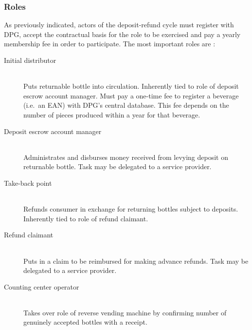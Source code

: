 \subsubsection{Roles}
\label{sec:DPGRoles}
As previously indicated, actors of the deposit-refund cycle must register with \ac{DPG}, accept the contractual basis for the role to be exercised and pay a yearly membership fee in order to participate. The most important roles are  \cite[pp.~15--16]{Hartlep2011Recycling}:   

\begin{description}
	\item[Initial distributor]
	\hfill \\
	Puts returnable bottle into circulation. Inherently tied to role of deposit escrow account manager. Must pay a one-time fee to register a beverage (i.e.~an \acs{EAN}) with \ac{DPG}'s central database. This fee depends on the number of pieces produced within a year for that beverage.
	\item[Deposit escrow account manager]
	\hfill \\
	Administrates and disburses money received from levying deposit on returnable bottle. Task may be delegated to a service provider.
	\item[Take-back point]
	\hfill \\
	Refunds consumer in exchange for returning bottles subject to deposits. Inherently tied to role of refund claimant.
	\item[Refund claimant]
	\hfill \\
	Puts in a claim to be reimbursed for making advance refunds. Task may be delegated to a service provider.
	\item[Counting center operator]
	\hfill \\
	Takes over role of reverse vending machine by confirming number of genuinely accepted bottles with a receipt. 
	
\end{description}

